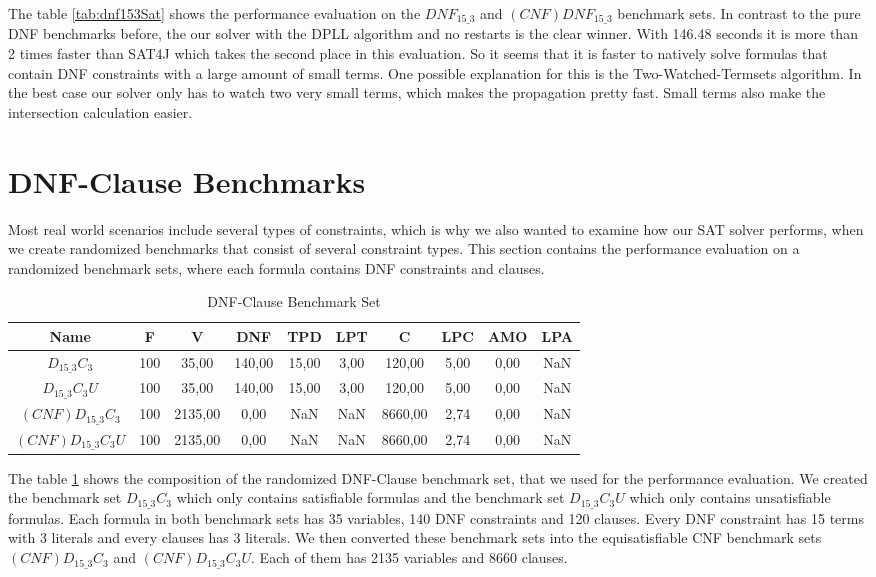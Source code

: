 The table \ref{tab:dnf153Sat} shows the performance evaluation on the $DNF_{15\_3}$ and $(CNF)DNF_{15\_3}$ benchmark sets. In contrast to the pure DNF benchmarks before, the our solver with the DPLL algorithm and no restarts is the clear winner. With 146.48 seconds it is more than 2 times faster than SAT4J which takes the second place in this evaluation. So it seems that it is faster to natively solve formulas that contain DNF constraints with a large amount of small terms. One possible explanation for this is the Two-Watched-Termsets algorithm. In the best case our solver only has to watch two very small terms, which makes the propagation pretty fast. Small terms also make the intersection calculation easier.

\section{DNF-Clause Benchmarks}

Most real world scenarios include several types of constraints, which is why we also wanted to examine how our SAT solver performs, when we create randomized benchmarks that consist of several constraint types. This section contains the performance evaluation on a randomized benchmark sets, where each formula contains DNF constraints and clauses.

\begin{table}[!htb]
\centering
\caption{DNF-Clause Benchmark Set}
\label{tab:dnfClauseBenchmark}
\begin{tabular}{|c|c|c|c|c|c|c|c|c|c|}
\hline
Name & F & V & DNF & TPD & LPT & C & LPC & AMO & LPA \\
\hline
$D_{15\_3}C_3$ & 100 & 35,00 & 140,00 & 15,00 & 3,00 & 120,00 & 5,00 & 0,00 & NaN \\ 
 \hline 
$D_{15\_3}C_3U$ & 100 & 35,00 & 140,00 & 15,00 & 3,00 & 120,00 & 5,00 & 0,00 & NaN \\ 
 \hline 
$(CNF)D_{15\_3}C_3$ & 100 & 2135,00 & 0,00 & NaN & NaN & 8660,00 & 2,74 & 0,00 & NaN \\ 
 \hline 
$(CNF)D_{15\_3}C_3U$ & 100 & 2135,00 & 0,00 & NaN & NaN & 8660,00 & 2,74 & 0,00 & NaN \\ 
 \hline 
\end{tabular}
\end{table}

The table \ref{tab:dnfClauseBenchmark} shows the composition of the randomized DNF-Clause benchmark set, that we used for the performance evaluation. We created the benchmark set $D_{15\_3}C_3$ which only contains satisfiable formulas and the benchmark set $D_{15\_3}C_3U$ which only contains unsatisfiable formulas. Each formula in both benchmark sets has 35 variables, 140 DNF constraints and 120 clauses. Every DNF constraint has 15 terms with 3 literals and every clauses has 3 literals. We then converted these benchmark sets into the equisatisfiable CNF benchmark sets $(CNF)D_{15\_3}C_3$ and $(CNF)D_{15\_3}C_3U$. Each of them has 2135 variables and 8660 clauses.


